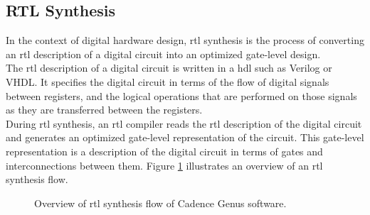 \documentclass[a4paper,11pt]{article}%
\begin{document}
\subsection{RTL Synthesis}

In the context of digital hardware design, \ac{rtl} synthesis is the process of converting an \ac{rtl} description of a digital circuit into an optimized gate-level design.\\

The \ac{rtl} description of a digital circuit is written in a \ac{hdl} such as Verilog or VHDL. It specifies the digital circuit in terms of the flow of digital signals between registers, and the logical operations that are performed on those signals as they are transferred between the registers.\\

During \ac{rtl} synthesis, an \ac{rtl} compiler reads the \ac{rtl} description of the digital circuit and generates an optimized gate-level representation of the circuit. This gate-level representation is a description of the digital circuit in terms of gates and interconnections between them. Figure \ref{fig:asic_flow} illustrates an overview of an \ac{rtl} synthesis flow.


\begin{figure}[H]
	\centering
	\caption{Overview of \ac{rtl} synthesis flow of Cadence Genus software\cite{genus_user_guide_2019}.}
	\label{fig:asic_flow}
\end{figure}
\end{document}
